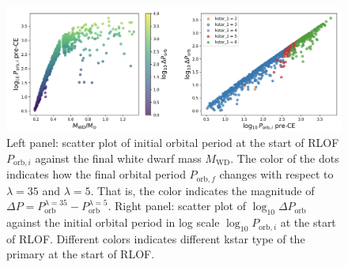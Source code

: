 \documentclass[12pt]{article}
\newcommand{\MWD}{M_{\mathrm{WD}}}
\newcommand{\Porb}{P_{\mathrm{orb}}}
\begin{document}
\begin{figure}
	\centering
	\includegraphics[width=\linewidth]{fig/dif-kstar two plot.png}
	\caption{Left panel: scatter plot of initial orbital period at the start of RLOF $P_{\mathrm{orb}, i}$ against the final white dwarf mass $\MWD$. The color of the dots indicates how the final orbital period $P_{\mathrm{orb}, f}$ changes with respect to $\lambda=35$ and $\lambda=5$. That is, the color indicates the magnitude of $\Delta P = P_{\mathrm{orb}}^{\lambda = 35} - P_{\mathrm{orb}}^{\lambda = 5}$. Right panel: scatter plot of $\log_{10} \Delta \Porb$ against the initial orbital period in log scale $\log_{10} P_{\mathrm{orb}, i}$ at the start of RLOF. Different colors indicates different kstar type of the primary at the start of RLOF.}
	\label{dif-kstar-exp}
\end{figure}



\end{document}
